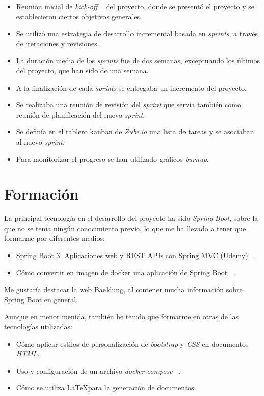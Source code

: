 \begin{itemize}
	\item Reunión inicial de \textit{kick-off} ~\cite{web:kickoff} del proyecto, donde se presentó el proyecto y se establecieron ciertos objetivos generales.
	\item Se utilizó una estrategia de desarrollo incremental basada en \textit{sprints}, a través de iteraciones y revisiones.
	\item La duración media de los \textit{sprints} fue de dos semanas, exceptuando los últimos del proyecto, que han sido de una semana.
	\item A la finalización de cada \textit{sprints} se entregaba un incremento del proyecto.
	\item Se realizaba una reunión de revisión del \textit{sprint} que servía también como reunión de planificación del nuevo \textit{sprint}.
	\item Se definía en el tablero kanban de \textit{Zube.io} una lista de tareas y se asociaban al nuevo \textit{sprint}.
	\item Para monitorizar el progreso se han utilizado gráficos \textit{burnup}.
\end{itemize}

\section{Formación}

La principal tecnología en el desarrollo del proyecto ha sido \textit{Spring Boot}, sobre la que no se tenía ningún conocimiento previo, lo que me ha llevado a tener que formarme por diferentes medios:

\begin{itemize}
	\item Spring Boot 3. Aplicaciones web y REST APIs con Spring MVC (Udemy) ~\cite{udemy:eliseo}.
	\item Cómo convertir en imagen de docker una aplicación de Spring Boot ~\cite{doc:springbootdocker}.
\end{itemize}

Me gustaría destacar la web \href{https://www.baeldung.com/spring-boot}{Baeldung}, al contener mucha información sobre Spring Boot en general.

Aunque en menor menida, también he tenido que formarme en otras de las tecnologías utilizadas:

\begin{itemize}
	\item Cómo aplicar estilos de personalización de \textit{bootstrap} y \textit{CSS} en documentos \textit{HTML}.
	\item Uso y configuración de un archivo \textit{docker compose} ~\cite{web:dockercompose}.
	\item Cómo se utiliza \LaTeX para la generación de documentos.
\end{itemize}

